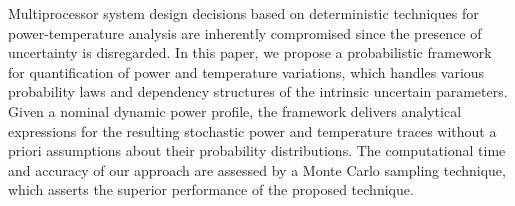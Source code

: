 Multiprocessor system design decisions based on deterministic techniques for power-temperature analysis are inherently compromised since the presence of uncertainty is disregarded. In this paper, we propose a probabilistic framework for quantification of power and temperature variations, which handles various probability laws and dependency structures of the intrinsic uncertain parameters. Given a nominal dynamic power profile, the framework delivers analytical expressions for the resulting stochastic power and temperature traces without a priori assumptions about their probability distributions. The computational time and accuracy of our approach are assessed by a Monte Carlo sampling technique, which asserts the superior performance of the proposed technique.
